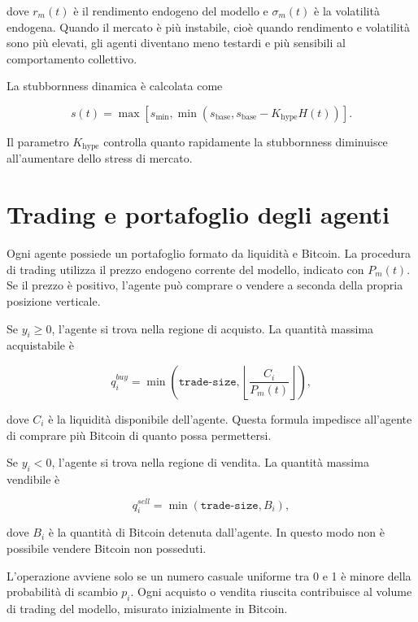 dove \(r_m(t)\) è il rendimento endogeno del modello e \(\sigma_m(t)\) è la
volatilità endogena. Quando il mercato è più instabile, cioè quando rendimento e
volatilità sono più elevati, gli agenti diventano meno testardi e più sensibili
al comportamento collettivo.

La stubbornness dinamica è calcolata come

\begin{equation}
    s(t)
    =
    \max
    \left[
    s_{\min},
    \min
    \left(
    s_{\mathrm{base}},
    s_{\mathrm{base}} -
    K_{\mathrm{hype}}H(t)
    \right)
    \right].
\end{equation}

Il parametro \(K_{\mathrm{hype}}\) controlla quanto rapidamente la stubbornness
diminuisce all'aumentare dello stress di mercato.

\section{Trading e portafoglio degli agenti}

Ogni agente possiede un portafoglio formato da liquidità e Bitcoin. La procedura
di trading utilizza il prezzo endogeno corrente del modello, indicato con
\(P_m(t)\). Se il prezzo è positivo, l'agente può comprare o vendere a seconda
della propria posizione verticale.

Se \(y_i \geq 0\), l'agente si trova nella regione di acquisto. La quantità
massima acquistabile è

\begin{equation}
    q_i^{buy}
    =
    \min
    \left(
    \texttt{trade-size},
    \left\lfloor
    \frac{C_i}{P_m(t)}
    \right\rfloor
    \right),
\end{equation}

dove \(C_i\) è la liquidità disponibile dell'agente. Questa formula impedisce
all'agente di comprare più Bitcoin di quanto possa permettersi.

Se \(y_i < 0\), l'agente si trova nella regione di vendita. La quantità massima
vendibile è

\begin{equation}
    q_i^{sell}
    =
    \min
    \left(
    \texttt{trade-size},
    B_i
    \right),
\end{equation}

dove \(B_i\) è la quantità di Bitcoin detenuta dall'agente. In questo modo non è
possibile vendere Bitcoin non posseduti.

L'operazione avviene solo se un numero casuale uniforme tra 0 e 1 è minore della
probabilità di scambio \(p_i\). Ogni acquisto o vendita riuscita contribuisce al
volume di trading del modello, misurato inizialmente in Bitcoin.

